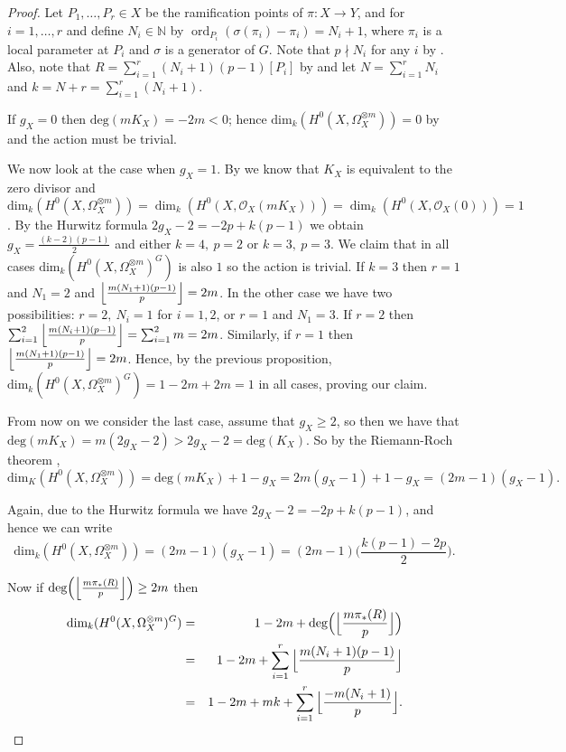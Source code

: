 \documentclass[11pt]{article} %
\DeclareMathOperator{\ord}{ord}
\begin{document}
\begin{proof}

Let $P_1,\ldots ,P_r\in X$ be the ramification points of $\pi:X\rightarrow Y$, and for $i=1,\ldots ,r$  and define $N_i\in \mathbb{N}$ by $\ord_{P_i}(\sigma(\pi_i)-\pi_i)=N_i+1$, where $\pi_i$ is a local parameter at $P_i$ and $\sigma$ is a generator of $G$. Note that $p\nmid N_i$ for any $i$ by \citep[Lem. 1, pg. 87]{naka}. Also, note that $R=\sum_{i=1}^r(N_i+1)(p-1)[P_i]$ by \citep[Prop. 4, {\S}1, Ch. IV]{localfields} and let $N=\sum_{i=1}^rN_i$ and $k=N+r=\sum_{i=1}^r(N_i+1)$.

If $g_X=0$ then $\mbox{deg}(mK_X)=-2m<0$; hence $\mbox{dim}_k(H^0(X,\Omega_X^{\otimes m}))=0$ by \citep[prop. 3, {\S}8]{fulton} and the action must be trivial.

We now look at the case when $g_X=1$. By \citep[Chap. IV,\ Example 1.3.6]{hart} we know that $K_X$ is equivalent to the zero divisor and $\mbox{dim}_k(H^0(X,\Omega_X^{\otimes m}))=\dim_k(H^0(X,\mathscr{O}_X(mK_X)))=\dim_k(H^0(X,\mathscr{O}_X(0)))=1$.  By the Hurwitz formula $2g_X-2=-2p+k(p-1)$ we obtain $g_X=\frac{(k-2)(p-1)}{2}$ and either $k=4,\ p=2$ or $k=3,\ p=3$. We claim that in all cases $\mbox{dim}_k(H^0(X,\Omega_X^{\otimes m})^G)$ is also $1$ so the action is trivial. If $k=3$ then $r=1$ and $N_1=2$ and $\Big{\lfloor}\frac{m(N_1+1)(p-1)}{p}\Big{\rfloor}=2m$. 
In the other case we have two possibilities: $r=2,\ N_i=1$ for $i=1,2$, or $r=1$ and $N_1=3$. If $r=2$ then $\sum_{i=1}^2\Big{\lfloor}\frac{m(N_i+1)(p-1)}{p}\Big{\rfloor}=\sum_{i=1}^2m=2m$.
Similarly, if $r=1$ then $\Big{\lfloor}\frac{m(N_1+1)(p-1)}{p}\Big{\rfloor}=2m$. Hence, by the previous proposition, $\mbox{dim}_k(H^0(X,\Omega_X^{\otimes m})^G)=1-2m+2m=1$ in all cases, proving our claim.

From now on we consider the last case, assume that $g_X\geq 2$, so then we have that $\mbox{deg}(mK_X)=m(2g_X-2)>2g_X-2=\mbox{deg}(K_X)$. So by the Riemann-Roch theorem \citep[Cor. 2, {\S}8]{fulton},
	\[
		\mbox{dim}_K(H^0(X,\Omega_X^{\otimes m}))=\mbox{deg}(mK_X)+1-g_X=2m(g_X-1)+1-g_X=(2m-1)(g_X-1).
	\]

Again, due to the Hurwitz formula we have $2g_X-2=-2p+k(p-1)$, and hence we can write
	\[
		\mbox{dim}_k(H^0(X,\Omega_X^{\otimes m}))=(2m-1)(g_X-1)=(2m-1)\Big(\frac{k(p-1)-2p}					{2}\Big).
	\]

Now if $\mbox{deg}\Big(\Big{\lfloor}{\frac{m\pi_*(R)}{p}}\Big{\rfloor}\Big)\geq 2m$ then
	\begin{eqnarray*}	
			\mbox{dim}_k(H^0(X,\Omega_X^{\otimes m})^G) & = & 1-2m+\mbox{deg}\Big(\Big{\lfloor}							{\frac{m\pi_*(R)}{p}}\Big{\rfloor}\Big) \\
			&= & 1-2m+\sum_{i=1}^r \Big{\lfloor}{\frac{m(N_i+1)(p-1)}{p}}\Big{\rfloor} \\
			&= & 1-2m+mk+\sum_{i=1}^r\Big{\lfloor}{\frac{-m(N_i+1)}{p}}\Big{\rfloor}. 
	\end{eqnarray*}
	

\end{proof}
\end{document}
